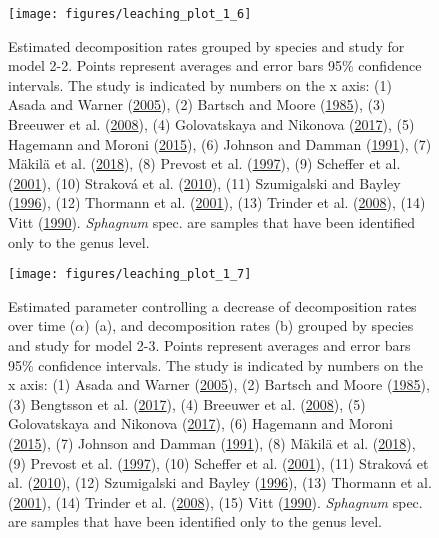 \documentclass[
  12pt,
]{article}
\begin{document}
\begin{figure}[H]

{\centering \texttt{[image: figures/leaching\_plot\_1\_6]} 

}

\caption{Estimated decomposition rates grouped by species and study for model 2-2. Points represent averages and error bars 95\% confidence intervals. The study is indicated by numbers on the x axis: (1) Asada and Warner (\protect\hyperlink{ref-Asada.2005b}{2005}), (2) Bartsch and Moore (\protect\hyperlink{ref-Bartsch.1985}{1985}), (3) Breeuwer et al. (\protect\hyperlink{ref-Breeuwer.2008}{2008}), (4) Golovatskaya and Nikonova (\protect\hyperlink{ref-Golovatskaya.2017}{2017}), (5) Hagemann and Moroni (\protect\hyperlink{ref-Hagemann.2015}{2015}), (6) Johnson and Damman (\protect\hyperlink{ref-Johnson.1991}{1991}), (7) Mäkilä et al. (\protect\hyperlink{ref-Makila.2018}{2018}), (8) Prevost et al. (\protect\hyperlink{ref-Prevost.1997}{1997}), (9) Scheffer et al. (\protect\hyperlink{ref-Scheffer.2001}{2001}), (10) Straková et al. (\protect\hyperlink{ref-Strakova.2010}{2010}), (11) Szumigalski and Bayley (\protect\hyperlink{ref-Szumigalski.1996}{1996}), (12) Thormann et al. (\protect\hyperlink{ref-Thormann.2001}{2001}), (13) Trinder et al. (\protect\hyperlink{ref-Trinder.2008}{2008}), (14) Vitt (\protect\hyperlink{ref-Vitt.1990}{1990}). \emph{Sphagnum} spec. are samples that have been identified only to the genus level.}\label{fig:sup-out-mm-p5-1-6}
\end{figure}
\begin{figure}[H]

{\centering \texttt{[image: figures/leaching\_plot\_1\_7]} 

}

\caption{Estimated parameter controlling a decrease of decomposition rates over time (\(\alpha\)) (a), and decomposition rates (b) grouped by species and study for model 2-3. Points represent averages and error bars 95\% confidence intervals. The study is indicated by numbers on the x axis: (1) Asada and Warner (\protect\hyperlink{ref-Asada.2005b}{2005}), (2) Bartsch and Moore (\protect\hyperlink{ref-Bartsch.1985}{1985}), (3) Bengtsson et al. (\protect\hyperlink{ref-Bengtsson.2017}{2017}), (4) Breeuwer et al. (\protect\hyperlink{ref-Breeuwer.2008}{2008}), (5) Golovatskaya and Nikonova (\protect\hyperlink{ref-Golovatskaya.2017}{2017}), (6) Hagemann and Moroni (\protect\hyperlink{ref-Hagemann.2015}{2015}), (7) Johnson and Damman (\protect\hyperlink{ref-Johnson.1991}{1991}), (8) Mäkilä et al. (\protect\hyperlink{ref-Makila.2018}{2018}), (9) Prevost et al. (\protect\hyperlink{ref-Prevost.1997}{1997}), (10) Scheffer et al. (\protect\hyperlink{ref-Scheffer.2001}{2001}), (11) Straková et al. (\protect\hyperlink{ref-Strakova.2010}{2010}), (12) Szumigalski and Bayley (\protect\hyperlink{ref-Szumigalski.1996}{1996}), (13) Thormann et al. (\protect\hyperlink{ref-Thormann.2001}{2001}), (14) Trinder et al. (\protect\hyperlink{ref-Trinder.2008}{2008}), (15) Vitt (\protect\hyperlink{ref-Vitt.1990}{1990}). \emph{Sphagnum} spec. are samples that have been identified only to the genus level.}\label{fig:sup-out-mm-p5-1-7}
\end{figure}
\end{document}
